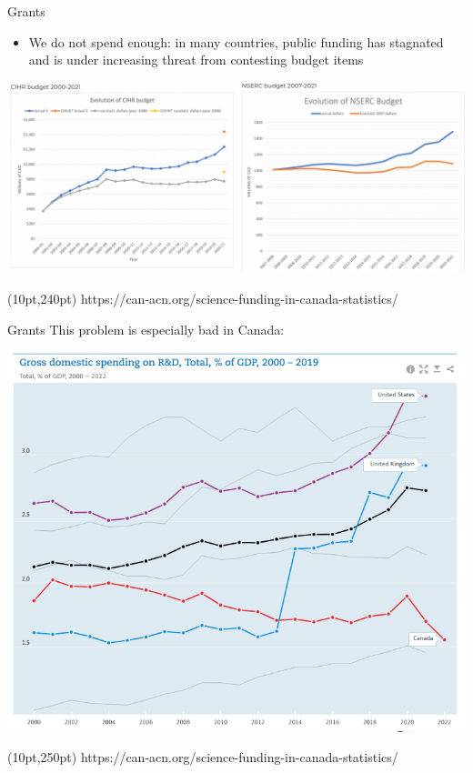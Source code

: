 \documentclass{beamer}
\begin{document}
\begin{frame}{Grants}
	\begin{itemize}
		\item We do not spend enough: in many countries, public funding has stagnated and is under increasing threat from contesting budget items
	\end{itemize}
	
	\includegraphics[width=1\textwidth]{../images/grantsCanada.png}

	\begin{textblock*}{300pt}(10pt,240pt)
		\tiny{https://can-acn.org/science-funding-in-canada-statistics/}

	\end{textblock*}
\end{frame}

\begin{frame}{Grants}
	This problem is especially bad in Canada:

	\includegraphics[width=.7\textwidth]{../images/fundinggdpcountries.png}

	\begin{textblock*}{300pt}(10pt,250pt)
		\tiny{https://can-acn.org/science-funding-in-canada-statistics/}

	\end{textblock*}
\end{frame}
\end{document}
